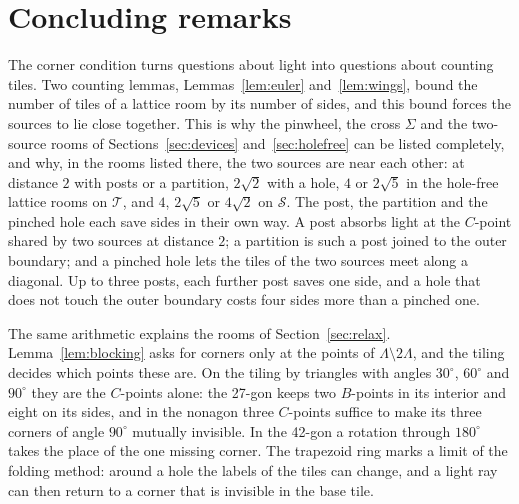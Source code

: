 \documentclass[11pt,a4paper]{article}
\theoremstyle{plain}
\theoremstyle{definition}
\theoremstyle{remark}
\newcommand{\T}{\mathcal{T}}
\newcommand{\Sq}{\mathcal{S}}
\newcommand{\dg}{^\circ}
\numberwithin{equation}{section}
\begin{document}
\section{Concluding remarks}\label{sec:conclusion}

The corner condition turns questions about light into questions about counting tiles. Two counting lemmas, Lemmas~\ref{lem:euler} and~\ref{lem:wings}, bound the number of tiles of a lattice room by its number of sides, and this bound forces the sources to lie close together. This is why the pinwheel, the cross $\Sigma$ and the two-source rooms of Sections~\ref{sec:devices} and~\ref{sec:holefree} can be listed completely, and why, in the rooms listed there, the two sources are near each other: at distance $2$ with posts or a partition, $2\sqrt2$ with a hole, $4$ or $2\sqrt5$ in the hole-free lattice rooms on $\T$, and $4$, $2\sqrt5$ or $4\sqrt2$ on $\Sq$. The post, the partition and the pinched hole each save sides in their own way. A post absorbs light at the $C$-point shared by two sources at distance $2$; a partition is such a post joined to the outer boundary; and a pinched hole lets the tiles of the two sources meet along a diagonal. Up to three posts, each further post saves one side, and a hole that does not touch the outer boundary costs four sides more than a pinched one.

The same arithmetic explains the rooms of Section~\ref{sec:relax}. Lemma~\ref{lem:blocking} asks for corners only at the points of $\Lambda\setminus2\Lambda$, and the tiling decides which points these are. On the tiling by triangles with angles $30\dg$, $60\dg$ and $90\dg$ they are the $C$-points alone: the 27-gon keeps two $B$-points in its interior and eight on its sides, and in the nonagon three $C$-points suffice to make its three corners of angle $90\dg$ mutually invisible. In the 42-gon a rotation through $180\dg$ takes the place of the one missing corner. The trapezoid ring marks a limit of the folding method: around a hole the labels of the tiles can change, and a light ray can then return to a corner that is invisible in the base tile.
\end{document}
